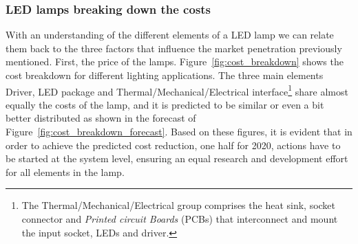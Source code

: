 \subsubsection{LED lamps breaking down the costs}
With an understanding of the different elements of a LED lamp we can relate them back to the three factors that influence the market penetration previously mentioned. First, the price of the lamps. Figure~\ref{fig:cost_breakdown} shows the cost breakdown for different lighting applications. The three main elements Driver, LED package and Thermal/Mechanical/Electrical interface\footnote{The Thermal/Mechanical/Electrical group comprises the heat sink, socket connector and \emph{Printed circuit Boards} (PCBs) that interconnect and mount the input socket, LEDs and driver.} share  almost equally the costs of the lamp, and it is predicted to be similar or even a bit better distributed as shown in the forecast of Figure~\ref{fig:cost_breakdown_forecast}. Based on these figures, it is evident that in order to achieve the predicted cost reduction, one half for 2020, actions have to be started at the system level, ensuring an equal research and development effort for all elements in the lamp.

